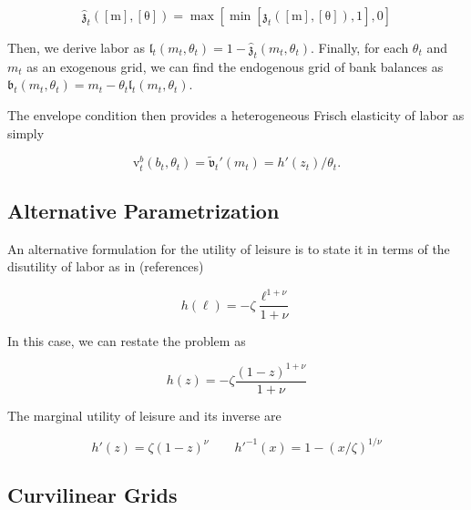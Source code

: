 \documentclass{article}
\newcommand{\tShkEmp}{\theta}
\newcommand{\labShare}{\nu}
\newcommand{\leiShare}{\zeta}
\newcommand{\h}{h}
\newcommand{\bRat}{b}
\newcommand{\leisure}{z}
\newcommand{\vFunc}{\mathrm{v}}
\newcommand{\labor}{\ell}
\newcommand{\mRat}{m}
\newcommand{\vOpt}{\tilde{\mathfrak{v}}}
\newcommand{\xRat}{x}
\newcommand{\mMat}{[\mathrm{m}]}
\newcommand{\tShkMat}{[\mathrm{\tShkEmp}]}
\newcommand{\zEndFunc}{\mathfrak{z}}
\newcommand{\lEndFunc}{\mathfrak{l}}
\newcommand{\bEndFunc}{\mathfrak{b}}
\begin{document}
\begin{equation}
\hat{\zEndFunc}_{t}(\mMat, \tShkMat) = \max \left[ \min \left[ \zEndFunc_{t}(\mMat, \tShkMat), 1 \right], 0 \right]
\end{equation}

Then, we derive labor as $\lEndFunc_{t}(\mRat_{t}, \tShkEmp_{t}) = 1 -
  \hat{\zEndFunc}_{t}(\mRat_{t}, \tShkEmp_{t})$. Finally, for each
$\tShkEmp_{t}$ and
$\mRat_{t}$ as an exogenous grid, we can find the endogenous grid of bank
balances as $\bEndFunc_{t}(\mRat_{t}, \tShkEmp_{t}) = \mRat_{t} -
  \tShkEmp_{t}\lEndFunc_{t}(\mRat_{t}, \tShkEmp_{t})$.

The envelope condition then provides a heterogeneous Frisch elasticity of labor as simply

\begin{equation}
\vFunc_{t}^{b}(\bRat_{t}, \tShkEmp_{t}) = \vOpt_{t}'(\mRat_{t}) =
  \h'(\leisure_{t})/\tShkEmp_{t}.
\end{equation}

\subsection{Alternative Parametrization}\label{Alternative Parametrization}

An alternative formulation for the utility of leisure is to state it in terms
of the disutility of labor as in (references)

\begin{equation}
\h(\labor) = - \leiShare \frac{\labor^{1+\labShare}}{1+\labShare}
\end{equation}

In this case, we can restate the problem as

\begin{equation}
\h(\leisure) = - \leiShare
  \frac{(1-\leisure)^{1+\labShare}}{1+\labShare}
\end{equation}

The marginal utility of leisure and its inverse are

\begin{equation}
\h'(\leisure) = \leiShare(1-\leisure)^{\labShare} \qquad
  \h'^{-1}(\xRat) = 1 - (\xRat/\leiShare)^{1/\labShare}
\end{equation}

\subsection{Curvilinear Grids}\label{Curvilinear Grids}
\end{document}
